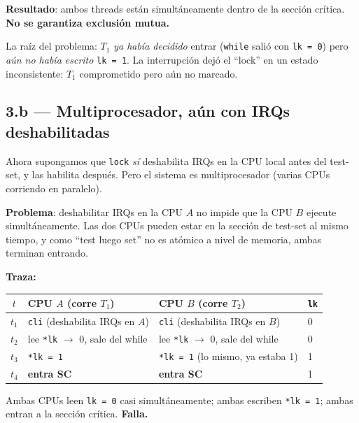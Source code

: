 \documentclass[11pt,a4paper]{article}
\begin{document}
\textbf{Resultado}: ambos threads están simultáneamente dentro de la
sección crítica. \textbf{No se garantiza exclusión mutua.}

La raíz del problema: $T_1$ \emph{ya había decidido} entrar
(\texttt{while} salió con \texttt{lk = 0}) pero \emph{aún no había
escrito} \texttt{lk = 1}. La interrupción dejó el ``lock'' en un
estado inconsistente: $T_1$ comprometido pero aún no marcado.

\subsection*{3.b --- Multiprocesador, aún con IRQs deshabilitadas}

Ahora supongamos que \texttt{lock} \emph{sí} deshabilita IRQs en la
CPU local antes del test-set, y las habilita después. Pero el sistema
es multiprocesador (varias CPUs corriendo en paralelo).

\textbf{Problema}: deshabilitar IRQs en la CPU $A$ no impide que la
CPU $B$ ejecute simultáneamente. Las dos CPUs pueden estar en la
sección de test-set al mismo tiempo, y como ``test luego set'' no es
atómico a nivel de memoria, ambas terminan entrando.

\textbf{Traza:}

\begin{center}
\small
\begin{tabular}{@{}clll@{}}
\toprule
$t$ & CPU $A$ (corre $T_1$) & CPU $B$ (corre $T_2$) & \texttt{lk} \\
\midrule
$t_1$ & \texttt{cli} (deshabilita IRQs en $A$) & \texttt{cli} (deshabilita IRQs en $B$) & 0 \\
$t_2$ & lee \texttt{*lk} $\to$ 0, sale del while & lee \texttt{*lk} $\to$ 0, sale del while & 0 \\
$t_3$ & \texttt{*lk = 1} & \texttt{*lk = 1} (lo mismo, ya estaba 1) & 1 \\
$t_4$ & \textbf{entra SC} & \textbf{entra SC}  & 1 \\
\bottomrule
\end{tabular}
\end{center}

Ambas CPUs leen \texttt{lk = 0} casi simultáneamente; ambas escriben
\texttt{*lk = 1}; ambas entran a la sección crítica. \textbf{Falla.}
\end{document}
